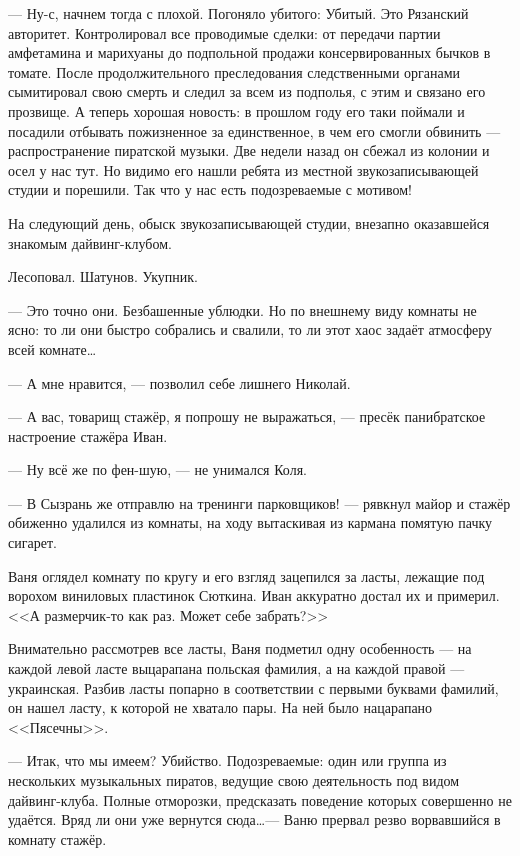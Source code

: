 --- Ну-с, начнем тогда с плохой. Погоняло убитого: Убитый. Это Рязанский авторитет. Контролировал все проводимые сделки: от передачи партии амфетамина и марихуаны до подпольной продажи консервированных бычков в томате. После продолжительного преследования следственными органами сымитировал свою смерть и следил за всем из подполья, с этим и связано его прозвище. А теперь хорошая новость: в прошлом году его таки поймали и посадили отбывать пожизненное за единственное, в чем его смогли обвинить --- распространение пиратской музыки. Две недели назад он сбежал из колонии и осел у нас тут. Но видимо его нашли ребята из местной звукозаписывающей студии и порешили. Так что у нас есть подозреваемые с мотивом!

\asterisks

На следующий день, обыск звукозаписывающей студии, внезапно оказавшейся знакомым дайвинг-клубом.

Лесоповал. Шатунов. Укупник.

--- Это точно они. Безбашенные ублюдки. Но по внешнему виду комнаты не ясно: то ли они быстро собрались и свалили, то ли этот хаос задаёт атмосферу всей комнате\ldots

--- А мне нравится, --- позволил себе лишнего Николай.

--- А вас, товарищ стажёр, я попрошу не выражаться, --- пресёк панибратское настроение стажёра Иван.

--- Ну всё же по фен-шую, --- не унимался Коля.

--- В Сызрань же отправлю на тренинги парковщиков! --- рявкнул майор и стажёр обиженно удалился из комнаты, на ходу вытаскивая из кармана помятую пачку сигарет.

Ваня оглядел комнату по кругу и его взгляд зацепился за ласты, лежащие под ворохом виниловых пластинок Сюткина. Иван аккуратно достал их и примерил. <<А размерчик-то как раз. Может себе забрать?>>

Внимательно рассмотрев все ласты, Ваня подметил одну особенность --- на каждой левой ласте выцарапана польская фамилия, а на каждой правой --- украинская. Разбив ласты попарно в соответствии с первыми буквами фамилий, он нашел ласту, к которой не хватало пары. На ней было нацарапано <<Пясечны>>.

\asterisks

--- Итак, что мы имеем? Убийство. Подозреваемые: один или группа из нескольких музыкальных пиратов, ведущие свою деятельность под видом дайвинг-клуба. Полные отморозки, предсказать поведение которых совершенно не удаётся. Вряд ли они уже вернутся сюда\ldots --- Ваню прервал резво ворвавшийся в комнату стажёр.

